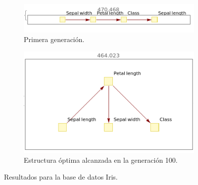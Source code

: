 \documentclass[10pt,a4paper]{article}
\begin{document}
\begin{figure}[htb!]
\begin{subfigure}[b]{0.475\textwidth}
            \includegraphics[width=\textwidth]{img/iris/first.png}
            \caption[ ]{{Primera generación.}}
        \end{subfigure}
        \hfill
        \begin{subfigure}[b]{0.475\textwidth}
            \centering 
            \includegraphics[width=\textwidth]{img/iris/best.png}
            \caption[ ]{{Estructura óptima alcanzada en la generación 100.}}
        \end{subfigure}

\caption{Resultados para la base de datos Iris.}
\label{fig:iris_results}
\end{figure}
\end{document}
